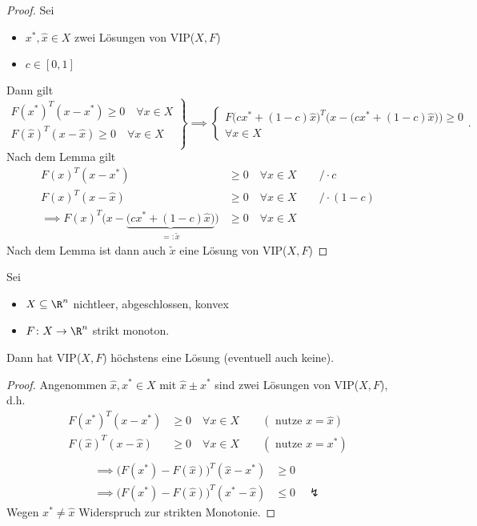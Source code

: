 \begin{proof}
	Sei
	\begin{itemize}
		\item ${x}^{*}, \hat{x} \in X$ zwei Lösungen von VIP($X,F$)
		\item $c \in [0,1]$
	\end{itemize}
	Dann gilt
	\[
		\left.
		\begin{array}{r}
		F({x}^{*})^{T}(x-{x}^{*}) \geq  0 \quad \forall x \in X \\
		F(\hat{x})^{T}(x-\hat{x}) \geq  0 \quad \forall x \in X \\
		\end{array}
	\right\}
	\implies
	\left\{
	\begin{array}{r}
	F\Big(c{x}^{*}+(1-c)\hat{x}\Big)^{T}\bigg(x-\Big(c{x}^{*}+(1-c)\hat{x}\Big)\bigg) \geq  0 \\ \forall x \in X
	\end{array}
	\right.
	.\] 
	Nach dem Lemma gilt
	\begin{align*}
		F(x)^{T}(x-{x}^{*}) &\geq 0 \quad \forall x \in X \qquad/\cdot c \\
		F(x)^{T}(x-\hat{x}) &\geq 0 \quad \forall x \in X \qquad/\cdot (1-c) \\
		\implies F(x)^{T}\bigg(x-\underbrace{\Big(c{x}^{*}+(1-c)\hat{x}\Big)}_{=:\tilde{x}} \bigg) &\geq 0 \quad \forall x \in X
	\end{align*}
	Nach dem Lemma ist dann auch $\tilde{x}$ eine Lösung von VIP($X,F$)
\end{proof}

\begin{satz}
	Sei
	\begin{itemize}
		\item $X \subseteq \R^{n}$ nichtleer, abgeschlossen, konvex
		\item $F \colon X \rightarrow \R^{n} $ strikt monoton.
	\end{itemize}
	Dann hat VIP($X,F$) höchstens eine Lösung (eventuell auch keine).
\end{satz}

\begin{proof}
	Angenommen $\hat{x}, {x}^{*} \in X$ mit $\hat{x} \pm {x}^{*}$ sind zwei Lösungen von VIP($X,F$), d.h.
	\begin{align*}
		F({x}^{*})^{T}(x-{x}^{*}) &\geq 0 \quad \forall x \in X \qquad (\text{ nutze }x=\hat{x}) \\
		F(\hat{x})^{T}(x-\hat{x}) &\geq 0 \quad \forall x \in X \qquad (\text{ nutze }x={x}^{*}) \\
	\end{align*}
	\begin{align*}
		\implies \Big( F({x}^{*}) - F(\hat{x}) \Big) ^{T} (\hat{x} - {x}^{*}) &\geq  0 \\
		\implies \Big( F({x}^{*}) - F(\hat{x}) \Big) ^{T} ({x}^{*} -\hat{x} ) &\leq  0 \quad\lightning
	\end{align*}
	Wegen ${x}^{*} \neq \hat{x}$ Widerspruch zur strikten Monotonie.
\end{proof}

